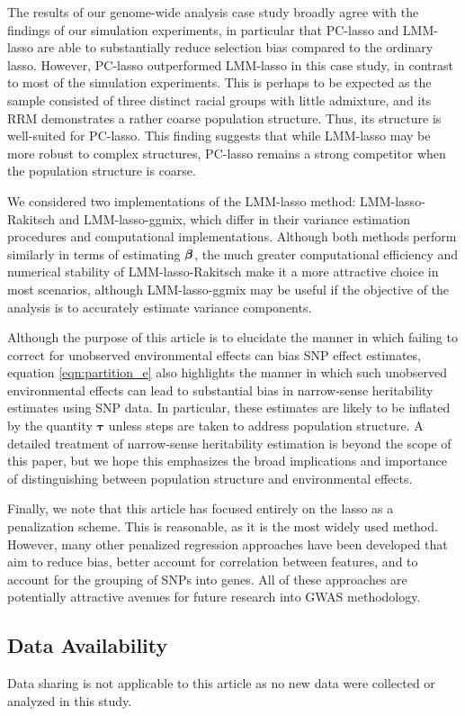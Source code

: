 The results of our genome-wide analysis case study broadly agree with the findings of our simulation experiments, in particular that PC-lasso and LMM-lasso are able to substantially reduce selection bias compared to the ordinary lasso. However, PC-lasso outperformed LMM-lasso in this case study, in contrast to most of the simulation experiments. This is perhaps to be expected as the sample consisted of three distinct racial groups with little admixture, and its RRM demonstrates a rather coarse population structure. Thus, its structure is well-suited for PC-lasso. This finding suggests that while LMM-lasso may be more robust to complex structures, PC-lasso remains a strong competitor when the population structure is coarse.

We considered two implementations of the LMM-lasso method: LMM-lasso-Rakitsch and LMM-lasso-ggmix, which differ in their variance estimation procedures and computational implementations. Although both methods perform similarly in terms of estimating $\boldsymbol{\beta}{}$, the much greater computational efficiency and numerical stability of LMM-lasso-Rakitsch make it a more attractive choice in most scenarios, although LMM-lasso-ggmix may be useful if the objective of the analysis is to accurately estimate variance components.

Although the purpose of this article is to elucidate the manner in which failing to correct for unobserved environmental effects can bias SNP effect estimates, equation \eqref{eqn:partition_e} also highlights the manner in which such unobserved environmental effects can lead to substantial bias in narrow-sense heritability estimates using SNP data. In particular, these estimates are likely to be inflated by the quantity $\boldsymbol{\tau}$ unless steps are taken to address population structure. A detailed treatment of narrow-sense heritability estimation is beyond the scope of this paper, but we hope this emphasizes the broad implications and importance of distinguishing between population structure and environmental effects.

Finally, we note that this article has focused entirely on the lasso as a penalization scheme. This is reasonable, as it is the most widely used method. However, many other penalized regression approaches have been developed that aim to reduce bias, better account for correlation between features, and to account for the grouping of SNPs into genes. All of these approaches are potentially attractive avenues for future research into GWAS methodology.

\subsection*{Data Availability}

Data sharing is not applicable to this article as no new data were collected or analyzed in this study.
